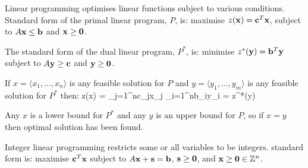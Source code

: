 \subject{Linear Programming} %

    Linear programming optimises linear functions subject to various conditions. Standard form of the primal linear program, $P$, is: maximise $z({\bf x}) = {\bf c}^T {\bf x}$, subject to $A{\bf x} \leq {\bf b}$ and ${\bf x} \geq {\bf 0}$.

    The standard form of the dual linear program, $P^{*}$, is: minimise $z^{*}({\bf y}) = {\bf b}^T {\bf y}$ subject to $A{\bf y} \geq {\bf c}$ and ${\bf y} \geq {\bf 0}$.



    If $x = \langle x_{1}, ..., x_{n} \rangle$ is any feasible solution for $P$ and $y = \langle y_{1}, ..., y_{m} \rangle$ is any feasible solution for $P^{*}$ then:
        \startformula
            z(x) = \sum_{j=1}^{n}c_{j}x_{j} \leq \sum_{i=1}^{n}b_{i}y_{i} = z^{*}(y)
        \stopformula

        Any $x$ is a lower bound for $P^{*}$ and any $y$ is an upper bound for $P$, so if $x = y$ then optimal solution has been found.


    Integer linear programming restricts some or all variables to be integers. standard form is: maximise ${\bf c}^T {\bf x}$ subject to $A{\bf x} + {\bf s} = {\bf b}$, ${\bf s} \geq {\bf 0}$, and ${\bf x} \geq {\bf 0} \in \mathbb{Z}^{n}$.

\subject{Intractability} %